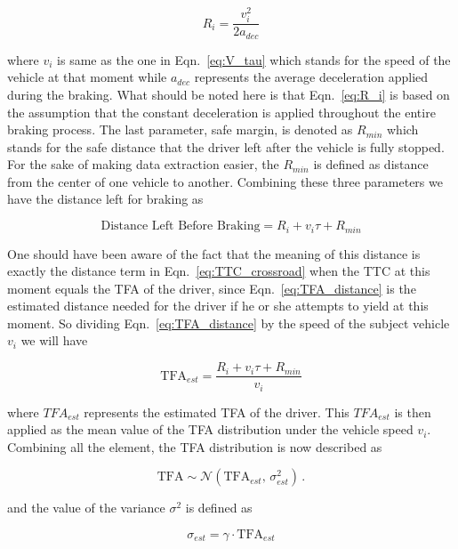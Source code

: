 \begin{equation}
R_{i} = \frac{v_i^2}{2a_{dec}}
\label{eq:R_i}
\end{equation}

where ${v_i}$ is same as the one in Eqn.~\ref{eq:V_tau} which stands for the speed of the vehicle at that moment while $a_{dec}$ represents the average deceleration applied during the braking. What should be noted here is that Eqn.~\ref{eq:R_i} is based on the assumption that the constant deceleration is applied throughout the entire braking process. The last parameter, safe margin, is denoted as $R_{min}$ which stands for the safe distance that the driver left after the vehicle is fully stopped. For the sake of making data extraction easier, the $R_{min}$ is defined as distance from the center of one vehicle to another. Combining these three parameters we have the distance left for braking as

\begin{equation}
\text{Distance Left Before Braking} = R_i+v_i\tau+R_{min}
\label{eq:TFA_distance}
\end{equation}

One should have been aware of the fact that the meaning of this distance is exactly the distance term in Eqn.~\ref{eq:TTC_crossroad} when the TTC at this moment equals the TFA of the driver, since Eqn.~\ref{eq:TFA_distance} is the estimated distance needed for the driver if he or she attempts to yield at this moment.  So dividing Eqn.~\ref{eq:TFA_distance} by the speed of the subject vehicle ${v_i}$ we will have

\begin{equation}
\text{TFA}_{est} = \frac{R_i+v_i\tau+R_{min}}{v_i} 
\label{eq:TFA_est}
\end{equation}


\noindent where ${TFA}_{est}$ represents the estimated TFA of the driver. This ${TFA}_{est}$ is then applied as the mean value of the TFA distribution under the vehicle speed ${v_i}$. Combining all the element, the TFA distribution is now described as


\begin{equation}
\text{TFA} \sim \mathcal{N}(\text{TFA}_{est},\,\sigma_{est}^{2})\,.
\label{eq:TFA_distribution}
\end{equation}

and the value of the variance $\sigma^2$ is defined as 

\begin{equation}
\sigma_{est} = \gamma \cdot \text{TFA}_{est}
\label{eq:TFA_distribution}
\end{equation}

